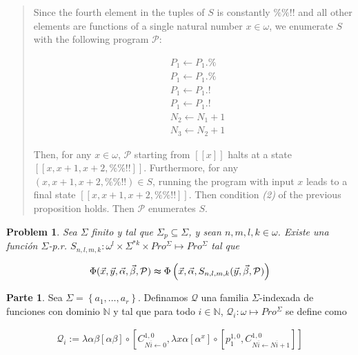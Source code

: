 \documentclass[a4paper, 12pt]{article}
\newtheorem{problem}{Problem}
\newtheorem{problem}{Problem}
\begin{document}
\small
\begin{quote}

Since the fourth element in the tuples of $S$ is constantly $\%\% ! !$ and all
other elements are functions of a single natural number $x \in \omega$, we
enumerate $S$ with the following program $\mathcal{P}$:

\begin{align*}
    &P_1 \leftarrow P_1.\% \\ 
    &P_1 \leftarrow P_1.\% \\
    &P_1 \leftarrow P_1.! \\
    &P_1 \leftarrow P_1.!\\
    &N_2 \leftarrow N_1 + 1 \\ 
    &N_3 \leftarrow N_2 + 1
\end{align*}

Then, for any $x \in  \omega$, $\mathcal{P}$ starting from $[\![ x ]\!]$ halts
at a state $[\![ x, x+1, x+2, \%\%!! ]\!]$. Furthermore, for any $(x, x+1, x+2,
\%\%!!) \in S$, running the program with input $x$ leads to a final state $[\![
x, x+1, x+2, \%\%!!]\!]$. Then condition \textit{(2)} of the previous
proposition holds. Then $\mathcal{P}$ enumerates $S$.


\end{quote}
\normalsize

\pagebreak 

\begin{problem}
    Sea $\Sigma$ finito y tal que $\Sigma_p \subseteq \Sigma$, y sean $n, m, l,
    k \in \omega$. Existe una función $\Sigma$-p.r. $S_{n,l,m,k} : \omega^{l}
    \times \Sigma^{*k} \times Pro^{\Sigma} \mapsto Pro^{\Sigma}$ tal que 

    \begin{align*}
        \Phi(\vec{x}, \vec{y}, \vec{\alpha}, \vec{\beta}, \mathcal{P}) \thickapprox
        \Phi\left(\vec{x}, \vec{\alpha}, S_{n, l, m, k} (\vec{y}, \vec{\beta},
        \mathcal{P})\right)
    \end{align*}
\end{problem}

\pagebreak

\textbf{Parte 1}. Sea $\Sigma = \left\{ a_1, \ldots, a_r \right\}$. Definamos
$\mathcal{Q}$ una familia $\Sigma$-indexada de funciones con dominio
$\mathbb{N}$ y tal que para todo $i \in \mathbb{N}$, $\mathcal{Q}_i :  \omega
\mapsto Pro^{\Sigma}$ se define como

\begin{align*}
    \mathcal{Q}_i := \lambda \alpha\beta \left[ \alpha\beta  \right] \circ
    \left[ C_{N\overline{i} \leftarrow 0}^{1, 0}, \lambda x\alpha \left[
    \alpha^x \right] \circ \left[ p_1^{1, 0}, C_{N\overline{i} \leftarrow
N\overline{i} + 1}^{1, 0} \right]  \right] 
\end{align*}
\end{document}
